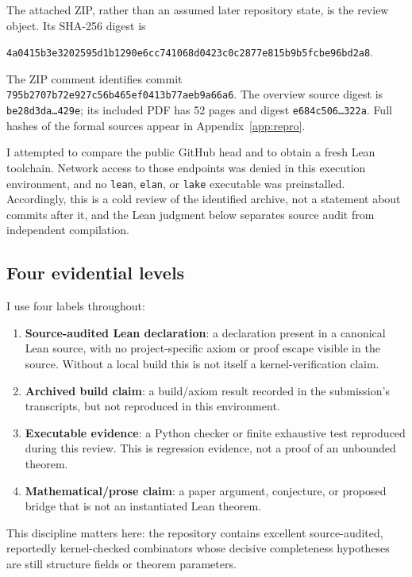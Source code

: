 \documentclass[11pt]{article}
\newcommand{\code}[1]{\texttt{#1}}
\begin{document}
The attached ZIP, rather than an assumed later repository state, is the review
object.  Its SHA-256 digest is
\begin{center}
\small\code{4a0415b3e3202595d1b1290e6cc741068d0423c0c2877e815b9b5fcbe96bd2a8}.
\end{center}
The ZIP comment identifies commit
\code{795b2707b72e927c56b465ef0413b77aeb9a66a6}.  The overview source digest is
\code{be28d3da\ldots429e}; its included PDF has 52 pages and digest
\code{e684c506\ldots322a}.  Full hashes of the formal sources appear in
Appendix~\ref{app:repro}.

I attempted to compare the public GitHub head and to obtain a fresh Lean
toolchain.  Network access to those endpoints was denied in this execution
environment, and no \code{lean}, \code{elan}, or \code{lake} executable was
preinstalled.  Accordingly, this is a cold review of the identified archive,
not a statement about commits after it, and the Lean judgment below separates
source audit from independent compilation.

\subsection{Four evidential levels}

I use four labels throughout:
\begin{enumerate}
  \item \textbf{Source-audited Lean declaration}: a declaration present in a
        canonical Lean source, with no project-specific axiom or proof escape
        visible in the source.  Without a local build this is not itself a
        kernel-verification claim.
  \item \textbf{Archived build claim}: a build/axiom result recorded in the
        submission's transcripts, but not reproduced in this environment.
  \item \textbf{Executable evidence}: a Python checker or finite exhaustive
        test reproduced during this review.  This is regression evidence, not
        a proof of an unbounded theorem.
  \item \textbf{Mathematical/prose claim}: a paper argument, conjecture, or
        proposed bridge that is not an instantiated Lean theorem.
\end{enumerate}
This discipline matters here: the repository contains excellent source-audited,
reportedly kernel-checked combinators whose decisive completeness hypotheses
are still structure fields or theorem parameters.
\end{document}
